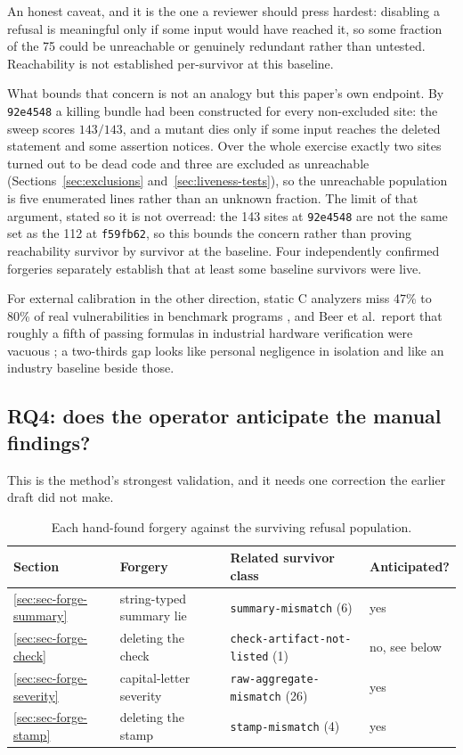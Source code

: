 \documentclass[11pt]{article}
\begin{document}
An honest caveat, and it is the one a reviewer should press hardest: disabling a refusal is
meaningful only if some input would have reached it, so some fraction of the 75 could be
unreachable or genuinely redundant rather than untested. Reachability is not established
per-survivor at this baseline.

What bounds that concern is not an analogy but this paper's own endpoint. By
\texttt{92e4548} a killing bundle had been constructed for every non-excluded site: the
sweep scores $143/143$, and a mutant dies only if some input reaches the deleted statement
and some assertion notices. Over the whole exercise exactly two sites turned out to be dead
code and three are excluded as unreachable (Sections~\ref{sec:exclusions}
and~\ref{sec:liveness-tests}), so the unreachable population is five enumerated lines rather
than an unknown fraction. The limit of that argument, stated so it is not overread: the 143
sites at \texttt{92e4548} are not the same set as the 112 at \texttt{f59fb62}, so this
bounds the concern rather than proving reachability survivor by survivor at the baseline.
Four independently confirmed forgeries separately establish that at least some baseline
survivors were live.

For external calibration in the other direction, static C analyzers miss 47\% to 80\% of
real vulnerabilities in benchmark programs \citep{lipp2022static}, and Beer et al.\ report
that roughly a fifth of passing formulas in industrial hardware verification were vacuous
\citep{beer2001vacuity}; a two-thirds gap looks like personal negligence in isolation and
like an industry baseline beside those.

\subsection{RQ4: does the operator anticipate the manual findings?}

This is the method's strongest validation, and it needs one correction the earlier draft did
not make.

\begin{table}[ht]
\centering
\caption{Each hand-found forgery against the surviving refusal population.}
\label{tab:predict}
\begin{tabular}{llll}
\toprule
Section & Forgery & Related survivor class & Anticipated? \\
\midrule
\ref{sec:sec-forge-summary} & string-typed summary lie & \texttt{summary-mismatch} (6) & yes \\
\ref{sec:sec-forge-check}   & deleting the check       & \texttt{check-artifact-not-listed} (1) & no, see below \\
\ref{sec:sec-forge-severity}& capital-letter severity  & \texttt{raw-aggregate-mismatch} (26) & yes \\
\ref{sec:sec-forge-stamp}   & deleting the stamp       & \texttt{stamp-mismatch} (4) & yes \\
\bottomrule
\end{tabular}
\end{table}
\end{document}
